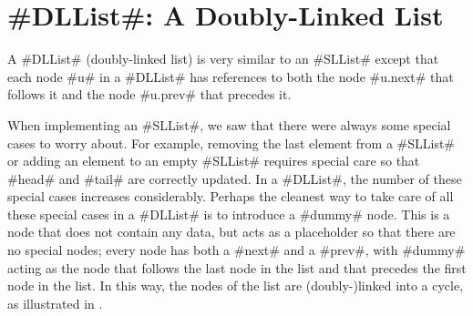 \section{#DLList#: A Doubly-Linked List}

A #DLList# (doubly-linked list) is very similar to an #SLList# except
that each node #u# in a #DLList# has references to both the node #u.next#
that follows it and the node #u.prev# that precedes it.


When implementing an #SLList#, we saw that there were always some special
cases to worry about. For example, removing the last element from a
#SLList# or adding an element to an empty #SLList# requires special
care so that #head# and #tail# are correctly updated.  In a #DLList#,
the number of these special cases increases considerably.  Perhaps the
cleanest way to take care of all these special cases in a #DLList# is to
introduce a #dummy# node. This is a node that does not contain any data,
but acts as a placeholder so that there are no special nodes; every node
has both a #next# and a #prev#, with #dummy# acting as the node that
follows the last node in the list and that precedes the first node in
the list.  In this way, the nodes of the list are (doubly-)linked into
a cycle, as illustrated in .

